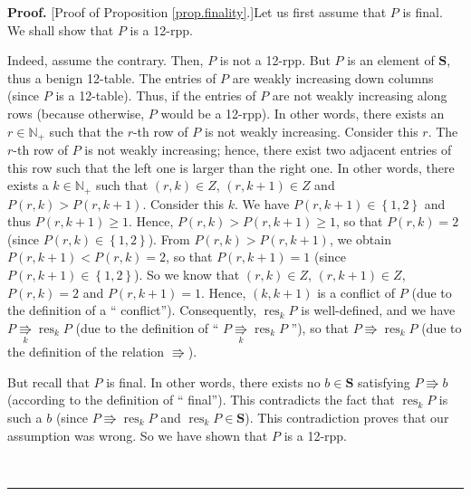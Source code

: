 \documentclass[numbers=enddot,12pt,final,onecolumn,notitlepage]{scrartcl}%
\theoremstyle{definition}
\newenvironment{proof}[1][Proof]{\noindent\textbf{#1.} }{\ \rule{0.5em}{0.5em}}
\begin{document}
\begin{proof}
[Proof of Proposition \ref{prop.finality}.]Let us first assume that $P$ is
final. We shall show that $P$ is a 12-rpp.

Indeed, assume the contrary. Then, $P$ is not a 12-rpp. But $P$ is an element
of $\mathbf{S}$, thus a benign 12-table. The entries of $P$ are weakly
increasing down columns (since $P$ is a 12-table). Thus, if the entries of $P$
are not weakly increasing along rows (because otherwise, $P$ would be a
12-rpp). In other words, there exists an $r\in\mathbb{N}_{+}$ such that the
$r$-th row of $P$ is not weakly increasing. Consider this $r$. The $r$-th row
of $P$ is not weakly increasing; hence, there exist two adjacent entries of
this row such that the left one is larger than the right one. In other words,
there exists a $k\in\mathbb{N}_{+}$ such that $\left(  r,k\right)  \in Z$,
$\left(  r,k+1\right)  \in Z$ and $P\left(  r,k\right)  >P\left(
r,k+1\right)  $. Consider this $k$. We have $P\left(  r,k+1\right)
\in\left\{  1,2\right\}  $ and thus $P\left(  r,k+1\right)  \geq1$. Hence,
$P\left(  r,k\right)  >P\left(  r,k+1\right)  \geq1$, so that $P\left(
r,k\right)  =2$ (since $P\left(  r,k\right)  \in\left\{  1,2\right\}  $). From
$P\left(  r,k\right)  >P\left(  r,k+1\right)  $, we obtain $P\left(
r,k+1\right)  <P\left(  r,k\right)  =2$, so that $P\left(  r,k+1\right)  =1$
(since $P\left(  r,k+1\right)  \in\left\{  1,2\right\}  $). So we know that
$\left(  r,k\right)  \in Z$, $\left(  r,k+1\right)  \in Z$, $P\left(
r,k\right)  =2$ and $P\left(  r,k+1\right)  =1$. Hence, $\left(  k,k+1\right)
$ is a conflict of $P$ (due to the definition of a \textquotedblleft
conflict\textquotedblright). Consequently, $\operatorname*{res}\nolimits_{k}P$
is well-defined, and we have $P\underset{k}{\Rrightarrow}\operatorname*{res}%
\nolimits_{k}P$ (due to the definition of \textquotedblleft%
$P\underset{k}{\Rrightarrow}\operatorname*{res}\nolimits_{k}P$%
\textquotedblright), so that $P\Rrightarrow\operatorname*{res}\nolimits_{k}P$
(due to the definition of the relation $\Rrightarrow$).

But recall that $P$ is final. In other words, there exists no $b\in\mathbf{S}$
satisfying $P\Rrightarrow b$ (according to the definition of \textquotedblleft
final\textquotedblright). This contradicts the fact that $\operatorname*{res}%
\nolimits_{k}P$ is such a $b$ (since $P\Rrightarrow\operatorname*{res}%
\nolimits_{k}P$ and $\operatorname*{res}\nolimits_{k}P\in\mathbf{S}$). This
contradiction proves that our assumption was wrong. So we have shown that $P$
is a 12-rpp.


\end{proof}
\end{document}
